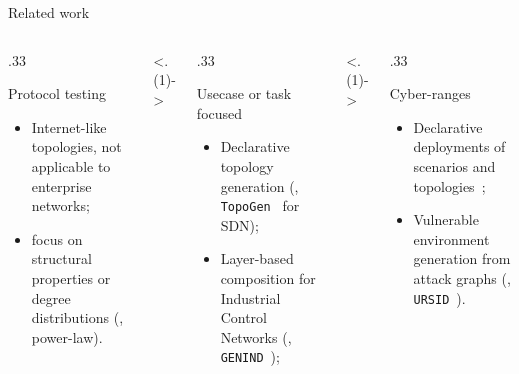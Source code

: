 \begin{frame}{Related work}
  \begin{columns}[t]

    \onslide<+->
    \begin{column}{.33\textwidth}
      \begin{block}{Protocol testing~\autocite{doar_BetterModelGenerating_1996,medina_BRITEApproachUniversal_2001}}
        \begin{itemize}
          \item Internet-like topologies, not applicable to enterprise networks;
          \item focus on structural properties or degree distributions (\eg, power-law).
        \end{itemize}
      \end{block}
    \end{column}

    \onslide<.(1)->
    \begin{column}{.33\textwidth}
      \begin{block}{Usecase or task focused}
        \begin{itemize}[<+->]
          \item Declarative topology generation (\eg, \texttt{TopoGen}~\autocite{laurito_TopoGenNetworkTopology_2017} for SDN);
          \item Layer-based composition for Industrial Control Networks (\eg, \texttt{GENIND}~\autocite{alrumaih_GENINDIndustrialNetwork_2023});
        \end{itemize}
      \end{block}
    \end{column}
    
    \onslide<.(1)->
    \begin{column}{.33\textwidth}
      \begin{block}{Cyber-ranges}
        \begin{itemize}[<+->]
          \item Declarative deployments of scenarios and topologies~\autocite{venkatesan_VulnerVANVulnerableNetwork_2019,yamin_ModelingExecutingCyber_2022};
          \item Vulnerable environment generation from attack graphs (\eg, \texttt{URSID}~\autocite{besson_URSIDAutomaticallyRefining_2024}).
        \end{itemize}
      \end{block}
    \end{column}
  \end{columns}


\end{frame}

